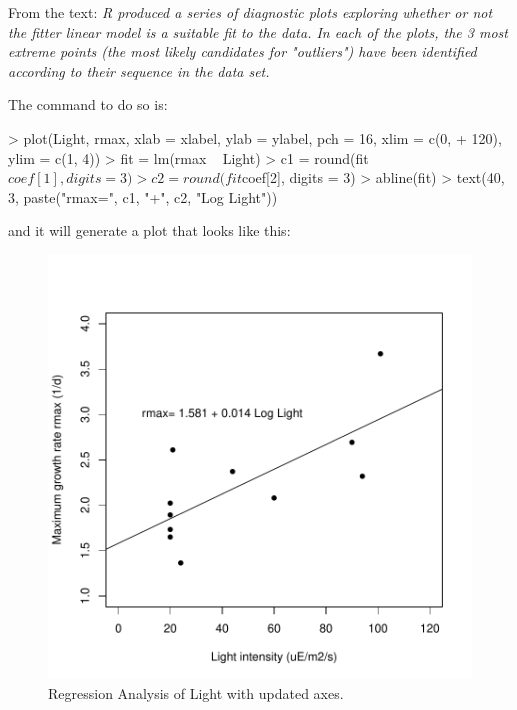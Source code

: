 \documentclass[11pt, oneside, reqno]{article}
\begin{document}
From the text: \emph{R produced a series of diagnostic plots exploring whether or not the fitter linear model is a suitable fit to the data. In each of the plots, the 3 most extreme points (the most likely candidates for "outliers") have been identified according to their sequence in the data set.}
\eans

The command to do so is:

\begin{Schunk}
\begin{Sinput}
> plot(Light, rmax, xlab = xlabel, ylab = ylabel, pch = 16, xlim = c(0, 
+     120), ylim = c(1, 4))
> fit = lm(rmax ~ Light)
> c1 = round(fit$coef[1], digits = 3)
> c2 = round(fit$coef[2], digits = 3)
> abline(fit)
> text(40, 3, paste("rmax=", c1, "+", c2, "Log Light"))
\end{Sinput}
\end{Schunk}

and it will generate a plot that looks like this:

\begin{figure}
\begin{center}
\includegraphics{exercises-fig3}
\end{center}
\caption{Regression Analysis of Light with updated axes.}
\label{fig:three}
\end{figure}
\eans
\end{document}
